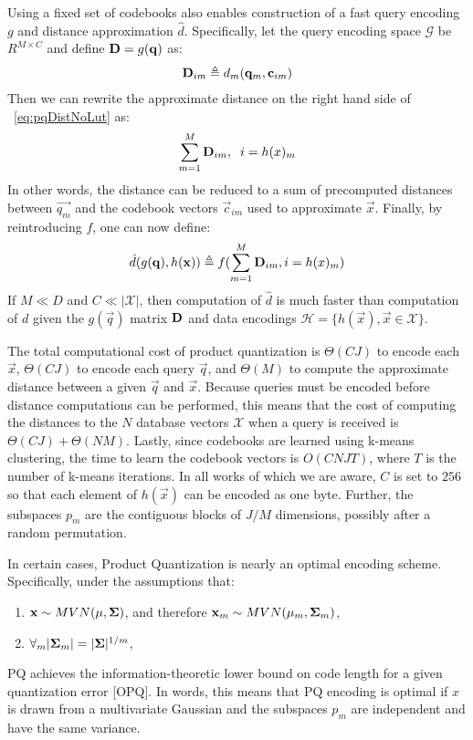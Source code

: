 Using a fixed set of codebooks also enables construction of a fast query encoding $g$ and distance approximation $\hat{d}$. Specifically, let the query encoding space $\mathcal{G}$ be $R^{M \times C}$ and define $\mathbf{D} = g(\mathbf{q})$ as: %
\begin{align}
    \mathbf{D}_{im} \triangleq d_m(\mathbf{q}_m, \mathbf{c}_{im})
\end{align}
Then we can rewrite the approximate distance on the right hand side of ~\ref{eq:pqDistNoLut} as:
\begin{align} \label{eq:pqDist}
        \sum_{m=1}^M \mathbf{D}_{im}, \hspace{2mm} i = h(x)_m
\end{align}
In other words, the distance can be reduced to a sum of precomputed distances between $\vec{q_m}$ and the codebook vectors $\vec{c}_{im}$ used to approximate $\vec{x}$. Finally, by reintroducing $f$, one can now define:
\begin{align} \label{eq:pq_dhat}
    \hat{d}(g(\mathbf{q}), h(\mathbf{x})) \triangleq f(\sum_{m=1}^M \mathbf{D}_{im}, i = h(x)_m)
\end{align}
If $M \ll D$ and $C \ll |\mathcal{X}|$, then computation of $\hat{d}$ is much faster than computation of $d$ given the $g(\vec{q})$ matrix $\mathbf{D}$ and data encodings $\mathcal{H} = \{h(\vec{x}), \vec{x} \in \mathcal{X} \}$.

The total computational cost of product quantization is $\Theta(CJ)$ to encode each $\vec{x}$, $\Theta(CJ)$ to encode each query $\vec{q}$, and $\Theta(M)$ to compute the approximate distance between a given $\vec{q}$ and $\vec{x}$. Because queries must be encoded before distance computations can be performed, this means that the cost of computing the distances to the $N$ database vectors $\mathcal{X}$ when a query is received is $\Theta(CJ) + \Theta(NM)$. Lastly, since codebooks are learned using k-means clustering, the time to learn the codebook vectors is $O(CNJT)$, where $T$ is the number of k-means iterations. In all works of which we are aware, $C$ is set to $256$ so that each element of $h(\vec{x})$ can be encoded as one byte. Further, the subspaces $p_m$ are the contiguous blocks of $J/M$ dimensions, possibly after a random permutation.

In certain cases, Product Quantization is nearly an optimal encoding scheme. Specifically, under the assumptions that:
\begin{enumerate}
\item $\mathbf{x} \sim MVN(\mathbf{\mu}, \mathbf{\Sigma})$, and therefore $\mathbf{x}_m \sim MVN(\mathbf{\mu}_m, \mathbf{\Sigma}_m)$,
\item $\forall_m |\mathbf{\Sigma}_m| = |\mathbf{\Sigma}|^{1/m}$,
\end{enumerate}
PQ achieves the information-theoretic lower bound on code length for a given quantization error [OPQ]. In words, this means that PQ encoding is optimal if $x$ is drawn from a multivariate Gaussian and the subspaces $p_m$ are independent and have the same variance.

